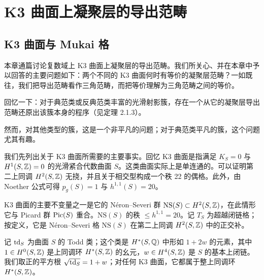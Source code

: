 \chapter{K3 曲面上凝聚层的导出范畴}
\section{K3 曲面与 Mukai 格}

本章通篇讨论复数域上 K3 曲面上凝聚层的导出范畴。我们所关心、并在本章中予以回答的主要问题如下：两个不同的 K3 曲面何时有等价的凝聚层范畴？一如既往，我们把导出范畴看作三角范畴，而把等价理解为三角范畴之间的等价。

回忆一下：对于典范类或反典范类丰富的光滑射影簇，存在一个从它的凝聚层导出范畴还原出该簇本身的程序（见定理 2.1.3）。

然而，对其他类型的簇，这是一个非平凡的问题；对于典范类平凡的簇，这个问题尤其有趣。

我们先列出关于 K3 曲面所需要的主要事实。回忆 K3 曲面是指满足 $K_S=0$ 与 $H^1(S,\mathbb{Z})=0$ 的光滑紧合代数曲面 $S$。这类曲面实际上是单连通的。可以证明第二上同调 $H^2(S,\mathbb{Z})$ 无挠，并且关于相交型构成一个秩 22 的偶格。此外，由 Noether 公式可得 $p_g(S)=1$ 与 $h^{1,1}(S)=20$。


K3 曲面的主要不变量之一是它的 Néron--Severi 群 $\mathrm{NS}(S)\subset H^2(S,\mathbb{Z})$，在此情形它与 Picard 群 $\operatorname{Pic}(S)$ 重合。$\mathrm{NS}(S)$ 的秩 $\leqslant h^{1,1}=20$。记 $T_S$ 为超越闭链格；按定义，它是 Néron--Severi 格 $\mathrm{NS}(S)$ 在第二上同调 $H^2(S,\mathbb{Z})$ 中的正交补。

记 $\operatorname{td}_S$ 为曲面 $S$ 的 Todd 类；这个类是 $H^*(S,\mathbb{Q})$ 中形如 $1+2w$ 的元素，其中 $1\in H^0(S,\mathbb{Z})$ 是上同调环 $H^*(S,\mathbb{Z})$ 的幺元，$w\in H^4(S,\mathbb{Z})$ 是 $S$ 的基本上闭链。我们取正的平方根 $\sqrt{\operatorname{td}_S}=1+w$；对任何 K3 曲面，它都属于整上同调环 $H^*(S,\mathbb{Z})$。

